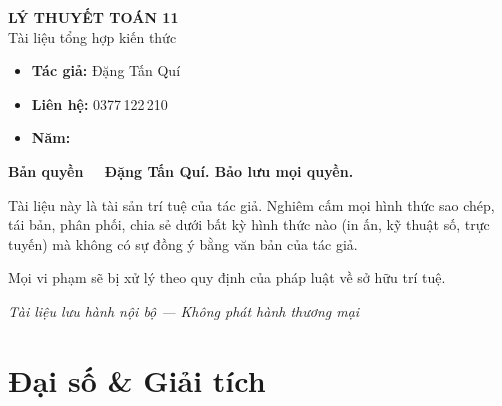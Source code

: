 \documentclass[12pt,a4paper]{article}
\begin{document}
\newpage

\thispagestyle{empty}
\vspace*{5cm}
\begin{center}
  {\Large\bfseries LÝ THUYẾT TOÁN 11}\\[8pt]
  {\large Tài liệu tổng hợp kiến thức}
\end{center}

\vspace{2cm}

\begin{tcolorbox}[
  enhanced, colback=red!3!white, colframe=red!60!black,
  fonttitle=\bfseries, title={Thông tin bản quyền},
  boxrule=1.5pt
]
  \begin{itemize}[leftmargin=*]
    \item \textbf{Tác giả:} Đặng Tấn Quí
    \item \textbf{Liên hệ:} 0377\,122\,210
    \item \textbf{Năm:} \the\year
  \end{itemize}

  \vspace{8pt}
  \textbf{Bản quyền \textcopyright\ \the\year\ Đặng Tấn Quí. Bảo lưu mọi quyền.}

  \vspace{6pt}
  Tài liệu này là tài sản trí tuệ của tác giả. Nghiêm cấm mọi hình thức sao chép, tái bản, phân phối, chia sẻ dưới bất kỳ hình thức nào (in ấn, kỹ thuật số, trực tuyến) mà không có sự đồng ý bằng văn bản của tác giả.

  \vspace{6pt}
  Mọi vi phạm sẽ bị xử lý theo quy định của pháp luật về sở hữu trí tuệ.
\end{tcolorbox}

\vfill
\begin{center}
  \small\textit{Tài liệu lưu hành nội bộ --- Không phát hành thương mại}
\end{center}

\newpage

\tableofcontents
\newpage

\section{Đại số \& Giải tích}
\end{document}
